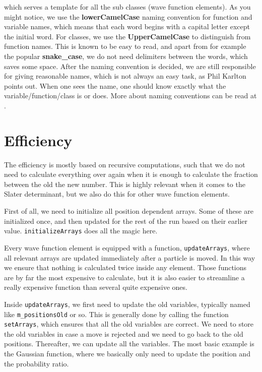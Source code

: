 which serves a template for all the sub classes (wave function elements). As you might notice, we use the \textbf{lowerCamelCase} naming convention for function and variable names, which means that each word begins with a capital letter except the initial word. For classes, we use the \textbf{UpperCamelCase} to distinguish from function names. This is known to be easy to read, and apart from for example the popular \textbf{snake\_case}, we do not need delimiters between the words, which saves some space. After the naming convention is decided, we are still responsible for giving reasonable names, which is not always an easy task, as Phil Karlton points out. When one sees the name, one should know exactly what the variable/function/class is or does. More about naming conventions can be read at \cite{noauthor_naming_2019}. 

\section{Efficiency}
The efficiency is mostly based on recursive computations, such that we do not need to calculate everything over again when it is enough to calculate the fraction between the old the new number. This is highly relevant when it comes to the Slater determinant, but we also do this for other wave function elements. 

First of all, we need to initialize all position dependent arrays. Some of these are initialized once, and then updated for the rest of the run based on their earlier value. \texttt{initializeArrays} does all the magic here.

Every wave function element is equipped with a function, \texttt{updateArrays}, where all relevant arrays are updated immediately after a particle is moved. In this way we ensure that nothing is calculated twice inside any element. Those functions are by far the most expensive to calculate, but it is also easier to streamline a really expensive function than several quite expensive ones. 

Inside \texttt{updateArrays}, we first need to update the old variables, typically named like \texttt{m\_positionsOld} or so. This is generally done by calling the function \texttt{setArrays}, which ensures that all the old variables are correct. We need to store the old variables in case a move is rejected and we need to go back to the old positions. Thereafter, we can update all the variables. The most basic example is the Gaussian function, where we basically only need to update the position and the probability ratio.

